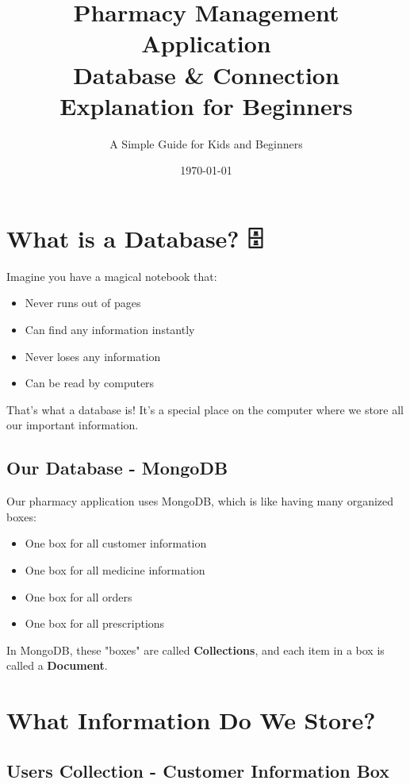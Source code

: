 \documentclass[12pt]{article}
\title{\textbf{Pharmacy Management Application} \\ Database \& Connection Explanation for Beginners}
\author{A Simple Guide for Kids and Beginners}
\date{\today}
\begin{document}
\maketitle
\newpage

\tableofcontents
\newpage

\section{What is a Database? 🗄️}

Imagine you have a magical notebook that:
\begin{itemize}
    \item Never runs out of pages
    \item Can find any information instantly
    \item Never loses any information
    \item Can be read by computers
\end{itemize}

That's what a database is! It's a special place on the computer where we store all our important information.

\subsection{Our Database - MongoDB}

Our pharmacy application uses MongoDB, which is like having many organized boxes:
\begin{itemize}
    \item One box for all customer information
    \item One box for all medicine information
    \item One box for all orders
    \item One box for all prescriptions
\end{itemize}

In MongoDB, these "boxes" are called \textbf{Collections}, and each item in a box is called a \textbf{Document}.

\section{What Information Do We Store?}

\subsection{Users Collection - Customer Information Box 👤}
\end{document}
